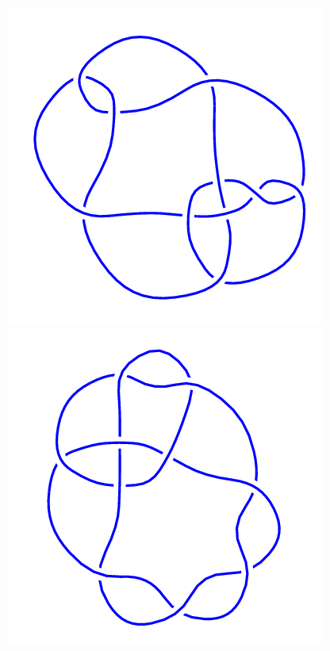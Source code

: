 \begin{figure}[H]
\begin{minipage}[b]{.18\linewidth}
    \end{minipage}
    \begin{minipage}[b]{.18\linewidth}
        \centering
        \includegraphics[width=\linewidth]{../data/10_84.png}
    \end{minipage}
    \begin{minipage}[b]{.18\linewidth}
        \centering
        \includegraphics[width=\linewidth]{../data/10_85.png}

\end{minipage}
\end{figure}
